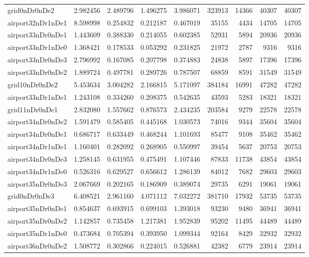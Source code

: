 \documentclass[../../../thesis.tex]{subfiles}
\begin{document}
\begin{longtable}{|l|r|r|r|r|r|r|r|r|}
grid0nDr0nDe2 & 2.982456 & 2.489796 & 1.496275 & 3.986071 & 323913 & 14366 & 40307 & 40307 \\
airport32nDr1nDe1 & 8.598998 & 0.254832 & 0.212187 & 0.467019 & 35155 & 4434 & 14705 & 14705 \\
airport33nDr0nDe1 & 1.443609 & 0.388330 & 0.214055 & 0.602385 & 52931 & 5894 & 20936 & 20936 \\
airport33nDr1nDe0 & 1.368421 & 0.178533 & 0.053292 & 0.231825 & 21972 & 2787 & 9316 & 9316 \\
airport33nDr0nDe3 & 2.796992 & 0.167085 & 0.207798 & 0.374883 & 24838 & 5897 & 17396 & 17396 \\
airport33nDr0nDe2 & 1.889724 & 0.497781 & 0.289726 & 0.787507 & 68859 & 8591 & 31549 & 31549 \\
grid10nDr0nDe2 & 5.453634 & 3.004282 & 2.166815 & 5.171097 & 384184 & 16991 & 47282 & 47282 \\
airport33nDr1nDe1 & 1.243108 & 0.334260 & 0.208375 & 0.542635 & 43593 & 5283 & 18321 & 18321 \\
grid11nDr0nDe1 & 2.832080 & 1.557662 & 0.876573 & 2.434235 & 203584 & 9279 & 22578 & 22578 \\
airport34nDr0nDe2 & 1.591479 & 0.585405 & 0.445168 & 1.030573 & 74016 & 9344 & 35604 & 35604 \\
airport34nDr0nDe1 & 0.686717 & 0.633449 & 0.468244 & 1.101693 & 85477 & 9108 & 35462 & 35462 \\
airport34nDr1nDe1 & 1.160401 & 0.282092 & 0.268905 & 0.550997 & 39454 & 5637 & 20753 & 20753 \\
airport34nDr0nDe3 & 1.258145 & 0.631955 & 0.475491 & 1.107446 & 87833 & 11738 & 43854 & 43854 \\
airport34nDr1nDe0 & 0.526316 & 0.629527 & 0.656612 & 1.286139 & 84012 & 7682 & 29603 & 29603 \\
airport35nDr0nDe3 & 2.067669 & 0.202165 & 0.186909 & 0.389074 & 29735 & 6291 & 19061 & 19061 \\
grid0nDr0nDe3 & 6.408521 & 2.961160 & 4.071112 & 7.032272 & 381710 & 17932 & 53735 & 53735 \\
airport35nDr0nDe1 & 0.854637 & 0.693915 & 0.699103 & 1.393018 & 93230 & 9480 & 36941 & 36941 \\
airport35nDr0nDe2 & 1.142857 & 0.735458 & 1.217381 & 1.952839 & 95202 & 11495 & 44489 & 44489 \\
airport35nDr1nDe0 & 0.473684 & 0.705394 & 0.393950 & 1.099344 & 92164 & 8429 & 32932 & 32932 \\
airport36nDr0nDe2 & 1.508772 & 0.302866 & 0.224015 & 0.526881 & 42382 & 6779 & 23914 & 23914 \\

\end{longtable}
\end{document}
